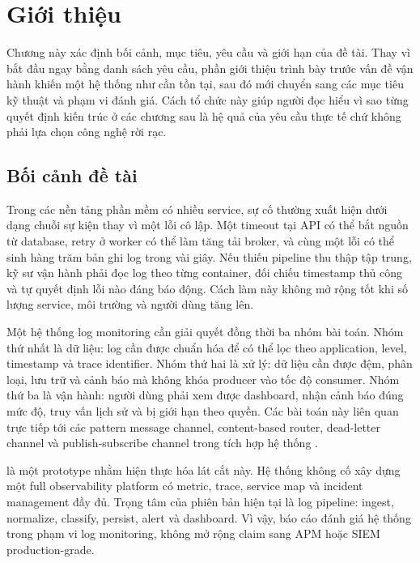 \chapter{Giới thiệu}

Chương này xác định bối cảnh, mục tiêu, yêu cầu và giới hạn của đề tài. Thay vì bắt đầu ngay bằng danh sách yêu cầu, phần giới thiệu trình bày trước vấn đề vận hành khiến một hệ thống như \LogRider{} cần tồn tại, sau đó mới chuyển sang các mục tiêu kỹ thuật và phạm vi đánh giá. Cách tổ chức này giúp người đọc hiểu vì sao từng quyết định kiến trúc ở các chương sau là hệ quả của yêu cầu thực tế chứ không phải lựa chọn công nghệ rời rạc.

\section{Bối cảnh đề tài}

Trong các nền tảng phần mềm có nhiều service, sự cố thường xuất hiện dưới dạng chuỗi sự kiện thay vì một lỗi cô lập. Một timeout tại API có thể bắt nguồn từ database, retry ở worker có thể làm tăng tải broker, và cùng một lỗi có thể sinh hàng trăm bản ghi log trong vài giây. Nếu thiếu pipeline thu thập tập trung, kỹ sư vận hành phải đọc log theo từng container, đối chiếu timestamp thủ công và tự quyết định lỗi nào đáng báo động. Cách làm này không mở rộng tốt khi số lượng service, môi trường và người dùng tăng lên.

Một hệ thống log monitoring cần giải quyết đồng thời ba nhóm bài toán. Nhóm thứ nhất là dữ liệu: log cần được chuẩn hóa để có thể lọc theo application, level, timestamp và trace identifier. Nhóm thứ hai là xử lý: dữ liệu cần được đệm, phân loại, lưu trữ và cảnh báo mà không khóa producer vào tốc độ consumer. Nhóm thứ ba là vận hành: người dùng phải xem được dashboard, nhận cảnh báo đúng mức độ, truy vấn lịch sử và bị giới hạn theo quyền. Các bài toán này liên quan trực tiếp tới các pattern message channel, content-based router, dead-letter channel và publish-subscribe channel trong tích hợp hệ thống \cite{eip2003,narkhede2017}.

\LogRider{} là một prototype nhằm hiện thực hóa lát cắt này. Hệ thống không cố xây dựng một full observability platform có metric, trace, service map và incident management đầy đủ. Trọng tâm của phiên bản hiện tại là log pipeline: ingest, normalize, classify, persist, alert và dashboard. Vì vậy, báo cáo đánh giá hệ thống trong phạm vi log monitoring, không mở rộng claim sang APM hoặc SIEM production-grade.

